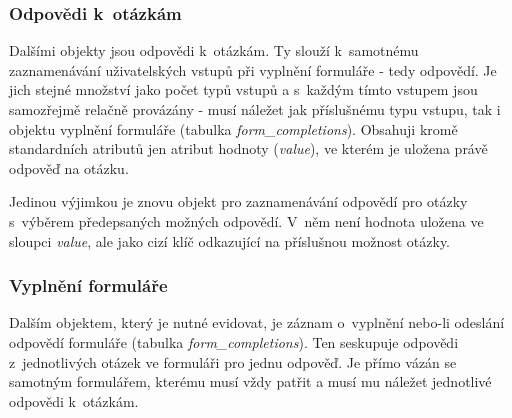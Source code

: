 	\subsubsection{Odpovědi k~otázkám}
	Dalšími objekty jsou odpovědi k~otázkám. Ty slouží k~samotnému zaznamenávání uživatelských vstupů při vyplnění formuláře - tedy odpovědí. Je jich stejné množství jako počet typů vstupů a s~každým tímto vstupem jsou samozřejmě relačně provázány - musí náležet jak příslušnému typu vstupu, tak i objektu vyplnění formuláře (tabulka \textit{form\_completions}). Obsahuji kromě standardních atributů jen atribut hodnoty (\textit{value}), ve kterém je uložena právě odpověď na otázku.
	
	Jedinou výjimkou je znovu objekt pro zaznamenávání odpovědí pro otázky s~výběrem předepsaných možných odpovědí. V~něm není hodnota uložena ve sloupci \textit{value}, ale jako cizí klíč odkazující na příslušnou možnost otázky.
	
	\subsubsection{Vyplnění formuláře}\label{sec:form_completions}
	Dalším objektem, který je nutné evidovat, je záznam o~vyplnění nebo-li odeslání odpovědí formuláře (tabulka \textit{form\_completions}). Ten seskupuje odpovědi z~jednotlivých otázek ve formuláři pro jednu odpověď. Je přímo vázán se samotným formulářem, kterému musí vždy patřit a musí mu náležet jednotlivé odpovědi k~otázkám.
	
	
	